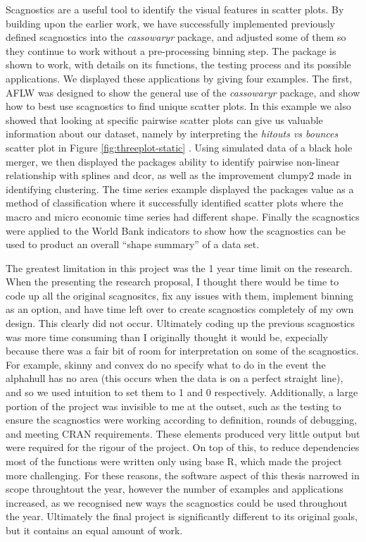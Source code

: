 Scagnostics are a useful tool to identify the visual features in scatter
plots. By building upon the earlier work, we have successfully
implemented previously defined scagnostics into the \emph{cassowaryr}
package, and adjusted some of them so they continue to work without a
pre-processing binning step. The package is shown to work, with details
on its functions, the testing process and its possible applications. We
displayed these applications by giving four examples. The first, AFLW
was designed to show the general use of the \emph{cassowaryr} package,
and show how to best use scagnostics to find unique scatter plots. In
this example we also showed that looking at specific pairwise scatter
plots can give us valuable information about our dataset, namely by
interpreting the \emph{hitouts vs bounces} scatter plot in Figure
\ref{fig:threeplot-static} . Using simulated data of a black hole
merger, we then displayed the packages ability to identify pairwise
non-linear relationship with splines and dcor, as well as the
improvement clumpy2 made in identifying clustering. The time series
example displayed the packages value as a method of classification where
it successfully identified scatter plots where the macro and micro
economic time series had different shape. Finally the scagnostics were
applied to the World Bank indicators to show how the scagnostics can be
used to product an overall ``shape summary'' of a data set.

The greatest limitation in this project was the 1 year time limit on the
research. When the presenting the research proposal, I thought there
would be time to code up all the original scagnositcs, fix any issues
with them, implement binning as an option, and have time left over to
create scagnostics completely of my own design. This clearly did not
occur. Ultimately coding up the previous scagnostics was more time
consuming than I originally thought it would be, expecially because
there was a fair bit of room for interpretation on some of the
scagnostics. For example, skinny and convex do no specify what to do in
the event the alphahull has no area (this occurs when the data is on a
perfect straight line), and so we used intuition to set them to 1 and 0
respectively. Additionally, a large portion of the project was invisible
to me at the outset, such as the testing to ensure the scagnostics were
working according to definition, rounds of debugging, and meeting CRAN
requirements. These elements produced very little output but were
required for the rigour of the project. On top of this, to reduce
dependencies most of the functions were written only using base R, which
made the project more challenging. For these reasons, the software
aspect of this thesis narrowed in scope throughtout the year, however
the number of examples and applications increased, as we recognised new
ways the scagnostics could be used throughout the year. Ultimately the
final project is significantly different to its original goals, but it
contains an equal amount of work.

